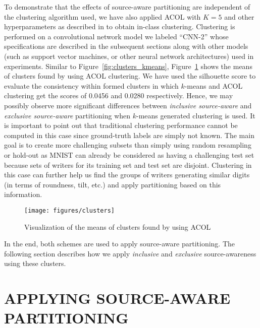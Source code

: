 \documentclass[letterpaper]{article}
\begin{document}
To demonstrate that the effects of source-aware partitioning are independent of the clustering algorithm used, we have also applied ACOL with $K=5$ and other hyperparameters as described in \cite{KilincU17deepclustering} to obtain in-class clustering. Clustering is performed on a convolutional network model we labeled ``CNN-2'' whose specifications are described in the subsequent sections along with other models (such as support vector machines, or other neural network architectures) used in experiments. Similar to Figure~\ref{fig:clusters_kmeans}, Figure~\ref{fig:clusters} shows the means of clusters found by using ACOL clustering. We have used the silhouette score \cite{Rousseeuw87silhouettes} to evaluate the consistency within formed clusters in which $k$-means and ACOL clustering get the scores of 0.0456 and 0.0280 respectively. Hence, we may possibly observe more significant differences between \textit{inclusive source-aware} and \textit{exclusive source-aware} partitioning when $k$-means generated clustering is used. It is important to point out that traditional clustering performance cannot be computed in this case since ground-truth labels are simply not known. The main goal is to create more challenging subsets than simply using random resampling or hold-out as MNIST can already be considered as having a challenging test set because sets of writers for its training set and test set are disjoint. Clustering in this case can further help us find the groups of writers generating similar digits (in terms of roundness, tilt, etc.) and apply partitioning based on this information. 
 
    
\begin{figure}[t]
	\begin{center}
		\centerline{\texttt{[image: figures/clusters]}}
		\caption{Visualization of the means of clusters found by using ACOL}
		\label{fig:clusters}
	\end{center}
\end{figure}

In the end, both schemes are used to apply source-aware partitioning. The following section describes how we apply \textit{inclusive} and \textit{exclusive} source-awareness using these clusters. 

\section{APPLYING SOURCE-AWARE PARTITIONING}
\end{document}
